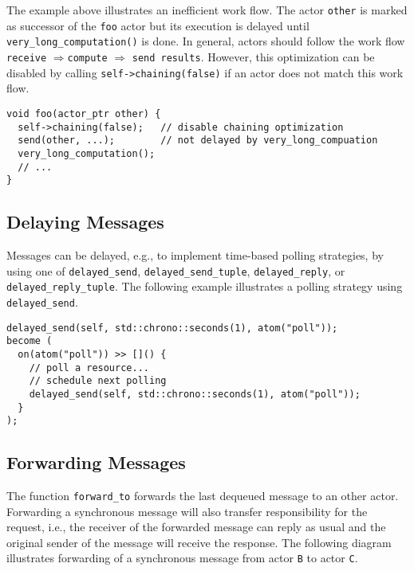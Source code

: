 The example above illustrates an inefficient work flow.
The actor \lstinline^other^ is marked as successor of the \lstinline^foo^ actor but its execution is delayed until \lstinline^very_long_computation()^ is done.
In general, actors should follow the work flow \lstinline^receive^ $\Rightarrow$\lstinline^compute^ $\Rightarrow$ \lstinline^send results^.
However, this optimization can be disabled by calling \lstinline^self->chaining(false)^ if an actor does not match this work flow.

\begin{lstlisting}
void foo(actor_ptr other) {
  self->chaining(false);   // disable chaining optimization
  send(other, ...);        // not delayed by very_long_compuation
  very_long_computation();
  // ...
}
\end{lstlisting}

\subsection{Delaying Messages}

Messages can be delayed, e.g., to implement time-based polling strategies, by using one of \lstinline^delayed_send^, \lstinline^delayed_send_tuple^, \lstinline^delayed_reply^, or \lstinline^delayed_reply_tuple^.
The following example illustrates a polling strategy using \lstinline^delayed_send^.

\begin{lstlisting}
delayed_send(self, std::chrono::seconds(1), atom("poll"));
become (
  on(atom("poll")) >> []() {
    // poll a resource...
    // schedule next polling
    delayed_send(self, std::chrono::seconds(1), atom("poll"));
  }
);
\end{lstlisting}

\clearpage
\subsection{Forwarding Messages}

The function \lstinline^forward_to^ forwards the last dequeued message to an other actor.
Forwarding a synchronous message will also transfer responsibility for the request, i.e., the receiver of the forwarded message can reply as usual and the original sender of the message will receive the response.
The following diagram illustrates forwarding of a synchronous message from actor \texttt{B} to actor \texttt{C}.

